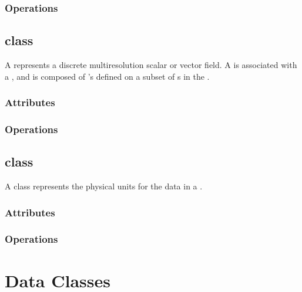 \subsection{Operations}

\section{ class} \label{ss:field}

A  represents a discrete multiresolution scalar or vector
field.  A  is associated with a , and is
composed of 's defined on a subset of s in the
.

\subsection{Attributes}

\subsection{Operations}

\section{ class}

A  class represents the physical units for the data in a
.

\subsection{Attributes}

\subsection{Operations}

\newpage

\chapter{Data Classes} \label{s:data-classes}

